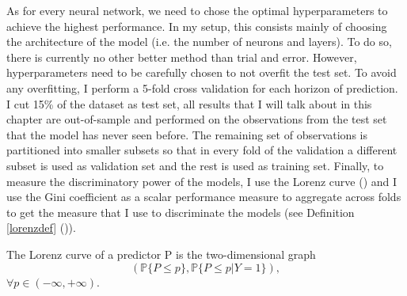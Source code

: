 As for every neural network, we need to chose the optimal hyperparameters to achieve the highest performance. In my setup, this consists mainly of choosing the architecture of the model (i.e. the number of neurons and layers). To do so, there is currently no other better method than trial and error. However, hyperparameters need to be carefully chosen to not overfit the test set. To avoid any overfitting, I perform a 5-fold cross validation for each horizon of prediction. I cut 15\% of the dataset as test set, all results that I will talk about in this chapter are out-of-sample and performed on the observations from the test set that the model has never seen before. The remaining set of observations is partitioned into smaller subsets so that in every fold of the validation a different subset is used as validation set and the rest is used as training set. Finally, to measure the discriminatory power of the models, I use the Lorenz curve (\citet{lorenz}) and I use the Gini coefficient as a scalar performance measure to aggregate across folds to get the  measure that I use to discriminate the models (see Definition \ref{lorenzdef} (\citet{leippold})). \\


\begin{definition}\label{lorenzdef}
The Lorenz curve of a predictor P is the two-dimensional graph
\begin{equation*}
    (\mathbb{P}\{P \leq p\},\mathbb{P}\{P\leq p | Y = 1\}),
\end{equation*}
$\forall p \in (-\infty,+\infty)$.
\end{definition}

